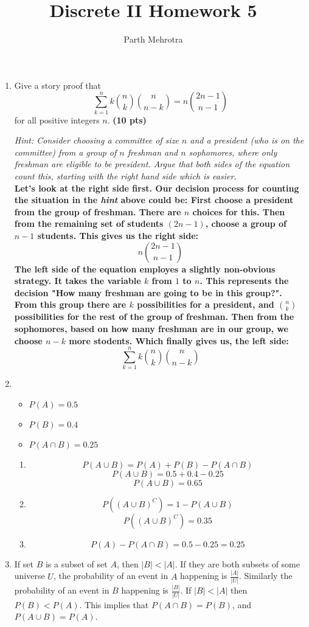 \documentclass{article}
\begin{document}
	\title{Discrete II Homework 5}
	\author{Parth Mehrotra}
	\maketitle

	\begin{enumerate}

		\item 
			Give a story proof that
			\[
			\sum_{k=1}^n k \binom{n}{k}\binom{n}{n-k} = n \binom{2n -1}{n-1}
			\]
			for all positive integers $n$. \textbf{(10 pts)}

			\emph{Hint:  Consider choosing a committee of size $n$ and a president (who is on the committee) from a
			group of $n$ freshman and $n$ sophomores, where only freshman are eligible to
			be president.  Argue that both sides of the equation count this, starting
			with the right hand side which is easier.}\\

			\textbf{
				Let's look at the right side first. Our decision process for counting the situation in the \emph{hint} above could be: First choose a president from the group of freshman. There are \(n\) choices for this. Then from the remaining set of students \((2n -1)\), choose a group of \(n-1\) students. This gives us the right side: 
				\[ n \binom{2n-1}{n-1} \]
				The left side of the equation employes a slightly non-obvious strategy. It takes the variable \(k\) from \(1\) to \(n\). This represents the decision "How many freshman are going to be in this group?". From this group there are \(k\) possibilities for a president, and \(\binom{n}{k}\) possibilities for the rest of the group of freshman. Then from the sophomores, based on how many freshman are in our group, we choose \(n-k\) more stodents. Which finally gives us, the left side:
				\[
					\sum_{k=1}^n k \binom{n}{k}\binom{n}{n-k}
				\]
			}

		\item
			\begin{itemize}
				\item \(P(A) = 0.5\)
				\item \(P(B) = 0.4\)
				\item \(P(A \cap B) = 0.25\)
			\end{itemize}
			\begin{enumerate}
				\item 
					\[P(A \cup B) = P(A) + P(B) - P(A \cap B) \]
					\[P(A \cup B) = 0.5 + 0.4 - 0.25 \]
					\[P(A \cup B) = 0.65\]
				\item
					\[P((A \cup B)^C) = 1-P(A \cup B) \]
					\[P((A \cup B)^C) = 0.35\]
				\item
					\[P(A) - P(A \cap B) = 0.5 - 0.25 = 0.25 \]
			\end{enumerate}

		\item
			If set \(B\) is a subset of set \(A\), then \(|B| < |A|\). If they are both subsets of some universe \(U\), the probability of an event in \(A\) happening is \(\frac{|A|}{|U|}\). Similarly the probability of an event in \(B\) happening is \(\frac{|B|}{|U|}\). If \(|B| < |A|\) then \(P(B) < P(A)\). This implies that \(P(A \cap B) = P(B)\), and \(P(A \cup B) = P(A)\).
	\end{enumerate}
\end{document}
